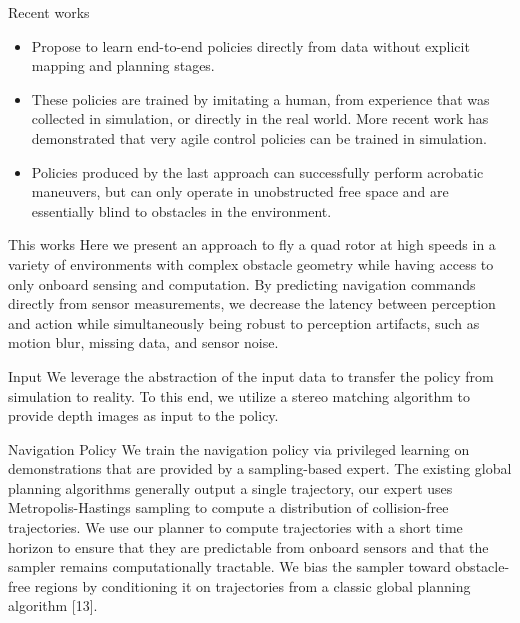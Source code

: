 \documentclass{beamer}
\begin{document}
\begin{frame}{Recent works}
	\begin{itemize}
		\item Propose to learn end-to-end policies directly from data without explicit mapping and planning stages. 
		\item These policies are trained by imitating a human, from experience that was collected in simulation, or directly in the real world. More recent work has demonstrated that very agile control policies can be trained in simulation. 
		\item Policies produced by the last approach can successfully perform acrobatic maneuvers, but can only operate in unobstructed free space and are essentially blind to obstacles in the environment.
	\end{itemize}
\end{frame}

\begin{frame}{This works}
	Here we present an approach to fly a quad rotor at high speeds in a variety of environments with complex obstacle geometry while having access to only onboard sensing and computation. By predicting navigation commands directly from sensor measurements, we decrease the latency between perception and action while simultaneously being robust to perception artifacts, such as motion blur, missing data, and sensor noise.
\end{frame}

\begin{frame}{Input}
	We leverage the abstraction of the input data to transfer the policy from simulation to reality. To this end, we utilize a stereo matching algorithm \autocite{stereoMatching} to provide depth images as input to the policy. 
\end{frame}


\begin{frame}{Navigation Policy}
	We train the navigation policy via privileged learning \autocite{Privileged_Learning} on demonstrations that are provided by a sampling-based expert. The existing global planning algorithms \autocite{global_planning} generally output a single trajectory, our expert uses Metropolis-Hastings \autocite{MH_hasting} sampling to compute a distribution of collision-free trajectories. We use our planner to compute trajectories with a short time horizon to ensure that they are predictable from onboard sensors and that the sampler remains computationally tractable. We bias the sampler toward obstacle-free regions by conditioning it on trajectories from a classic global planning algorithm [13].
	
\end{frame}
\end{document}
